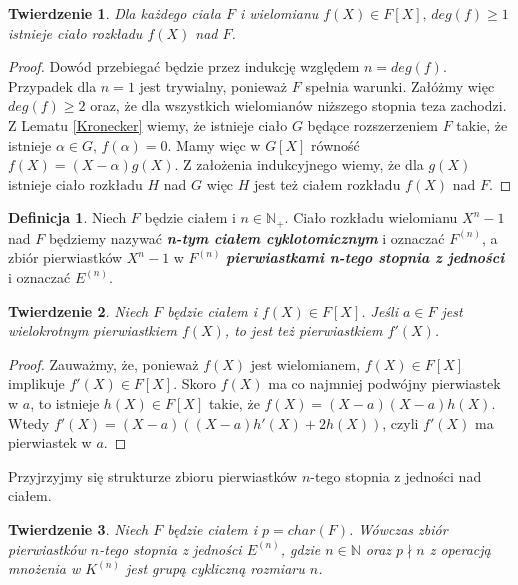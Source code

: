 \documentclass[declaration,shortabstract]{iithesis}
\theoremstyle{definition}
\newtheorem{definition}{Definicja}
\theoremstyle{remark} \newtheorem{observation}{Obserwacja}
\theoremstyle{plain} \newtheorem{theorem}{Twierdzenie}
\theoremstyle{plain} \newtheorem{lemma}{Lemat}
\theoremstyle{remark} \newtheorem*{remark*}{Uwaga}
\theoremstyle{reminder} \newtheorem*{reminder*}{Przypomnienie}
\begin{document}
	
\begin{theorem}
	Dla każdego ciała $F$ i wielomianu $f(X) \in F[X], \, deg(f) \geq 1$ istnieje ciało rozkładu $f(X)$ nad $F$.
\end{theorem}
	
\begin{proof}
	Dowód przebiegać będzie przez indukcję względem $n = deg(f)$. Przypadek dla $n = 1$ jest trywialny, ponieważ $F$ spełnia warunki. Załóżmy więc $deg(f) \geq 2$ oraz, że dla wszystkich wielomianów niższego stopnia teza zachodzi. Z Lematu \ref{Kronecker} wiemy, że istnieje ciało $G$ będące rozszerzeniem $F$ takie, że istnieje $\alpha \in G, \, f(\alpha) = 0$. Mamy więc w $G[X]$ równość $f(X) = (X - \alpha)g(X)$. Z założenia indukcyjnego wiemy, że dla $g(X)$ istnieje ciało rozkładu $H$ nad $G$ więc $H$ jest też ciałem rozkładu $f(X)$ nad $F$.
\end{proof}
	
\begin{definition}
	Niech $F$ będzie ciałem i $n \in \mathbb{N}_+$. Ciało rozkładu  wielomianu $X^n - 1$ nad $F$ będziemy nazywać \textit{\textbf{n-tym ciałem cyklotomicznym}} i oznaczać $F^{(n)}$, a zbiór pierwiastków $X^n - 1$ w $F^{(n)}$ \textit{\textbf{pierwiastkami n-tego stopnia z jedności}} i oznaczać $E^{(n)}$.
\end{definition}
	
\begin{theorem} \label{mult_root}
	Niech $F$ będzie ciałem i $f(X) \in F[X]$. Jeśli $a \in F$ jest wielokrotnym pierwiastkiem $f(X)$, to jest też pierwiastkiem $f'(X)$.
\end{theorem}
	
\begin{proof}
	Zauważmy, że, ponieważ $f(X)$ jest wielomianem, $f(X) \in F[X]$ implikuje $f'(X) \in F[X]$. Skoro $f(X)$ ma co najmniej podwójny pierwiastek w $a$, to istnieje $h(X) \in F[X]$ takie, że $f(X) = (X - a)(X - a)h(X)$. Wtedy $f'(X) = (X - a)((X - a)h'(X) + 2h(X))$, czyli $f'(X)$ ma pierwiastek w $a$.
\end{proof}

Przyjrzyjmy się strukturze zbioru pierwiastków $n$-tego stopnia z jedności nad ciałem. 
	
\begin{theorem}
	Niech $F$ będzie ciałem i $p = char(F)$. Wówczas zbiór pierwiastków $n$-tego stopnia z jedności $E^{(n)}$, gdzie $n \in \mathbb{N}$ oraz $p \nmid n$ z operacją mnożenia w $K^{(n)}$ jest grupą cykliczną rozmiaru $n$.
\end{theorem}
	
\end{document}
